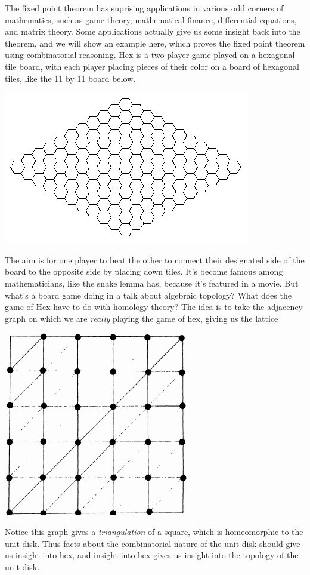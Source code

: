 \documentclass{article}
\theoremstyle{plain}
\begin{document}
The fixed point theorem has suprising applications in various odd corners of mathematics, such as game theory, mathematical finance, differential equations, and matrix theory. Some applications actually give us some insight back into the theorem, and we will show an example here, which proves the fixed point theorem using combinatorial reasoning. Hex is a two player game played on a hexagonal tile board, with each player placing pieces of their color on a board of hexagonal tiles, like the 11 by 11 board below.
%
\begin{center}
\includegraphics[scale=0.4]{hex.jpg}
\end{center}
%
The aim is for one player to beat the other to connect their designated side of the board to the opposite side by placing down tiles. It's become famous among mathematicians, like the snake lemma has, because it's featured in a movie. But what's a board game doing in a talk about algebraic topology? What does the game of Hex have to do with homology theory? The idea is to take the adjacency graph on which we are {\it really} playing the game of hex, giving us the lattice
%
\begin{center}
\includegraphics[scale=0.4]{lattice.jpg}
\end{center}
%
Notice this graph gives a {\it triangulation} of a square, which is homeomorphic to the unit disk. Thus facts about the combinatorial nature of the unit disk should give us insight into hex, and insight into hex gives us insight into the topology of the unit disk.
\end{document}
